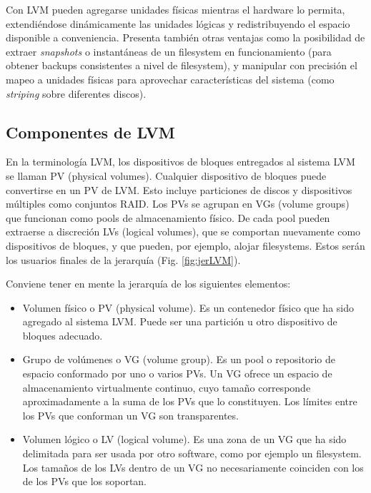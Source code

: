 Con LVM pueden agregarse unidades físicas mientras el hardware lo permita, extendiéndose dinámicamente las unidades lógicas y redistribuyendo el espacio disponible a conveniencia. Presenta también otras ventajas como la posibilidad de extraer \emph{snapshots} o instantáneas de un filesystem en funcionamiento (para obtener backups consistentes a nivel de filesystem), y manipular con precisión el mapeo a unidades físicas para aprovechar características del sistema (como \emph{striping} sobre diferentes discos).






\subsection{Componentes de LVM}
\label{sub:compLVM}
En la terminología LVM, los dispositivos de bloques entregados al sistema LVM se llaman PV (physical volumes). Cualquier dispositivo de bloques puede convertirse en un PV de LVM. Esto incluye particiones de discos y dispositivos múltiples como conjuntos RAID. Los PVs se agrupan en VGs (volume groups) que funcionan como pools de almacenamiento físico. De cada pool pueden extraerse a discreción LVs (logical volumes), que se comportan nuevamente como dispositivos de bloques, y que pueden, por ejemplo, alojar filesystems. Estos serán los usuarios finales de la jerarquía (Fig. \ref{fig:jerLVM}).



Conviene tener en mente la jerarquía de los siguientes elementos:


\begin{itemize}
	\item Volumen físico o PV (physical volume). Es un contenedor físico que ha sido agregado al sistema LVM. Puede ser una partición u otro dispositivo de bloques adecuado.
	\item Grupo de volúmenes o VG (volume group). Es un pool o repositorio de espacio conformado por uno o varios PVs. Un VG ofrece un espacio de almacenamiento virtualmente continuo, cuyo tamaño corresponde aproximadamente a la suma de los PVs que lo constituyen. Los límites entre los PVs que conforman un VG son transparentes.
	\item Volumen lógico o LV (logical volume). Es una zona de un VG que ha sido delimitada para ser usada por otro software, como por ejemplo un filesystem. Los tamaños de los LVs dentro de un VG no necesariamente coinciden con los de los PVs que los soportan.
\end{itemize}

